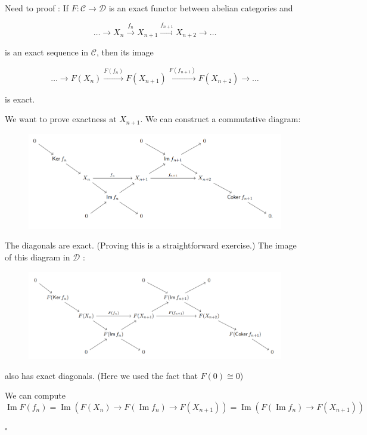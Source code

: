 \documentclass{article}
\newenvironment{Proof}{{\noindent \indent \it Proof:\quad}}{\hfill $\square$\par}
\begin{document}
\begin{Proof}
Need to proof : If $F: \mathscr{C} \rightarrow \mathscr{D}$ is an exact functor between abelian categories and

$$
\ldots \rightarrow X_{n} \stackrel{f_{n}}{\longrightarrow} X_{n+1} \stackrel{f_{n+1}}{\longrightarrow} X_{n+2} \rightarrow \ldots
$$

is an exact sequence in $\mathscr{C}$, then its image

$$
\ldots \rightarrow F\left(X_{n}\right) \stackrel{F\left(f_{n}\right)}{\longrightarrow} F\left(X_{n+1}\right) \stackrel{F\left(f_{n+1}\right)}{\longrightarrow} F\left(X_{n+2}\right) \rightarrow \ldots
$$

is exact.

We want to prove exactness at $X_{n+1}$. We can construct a commutative diagram:
\begin{figure}[htp]
    \centering
    \includegraphics[width=15cm]{1.png}
    \label{fig:1}
\end{figure}

The diagonals are exact. (Proving this is a straightforward exercise.) The image of this diagram in $\mathscr{D}$ :
\begin{figure}[htp]
    \centering
    \includegraphics[width=15cm]{2.png}
    \label{fig:2}
\end{figure}

also has exact diagonals. (Here we used the fact that $F(0) \cong 0$)

We can compute
$$
\operatorname{Im} F\left(f_{n}\right)=\operatorname{Im}\left(F\left(X_{n}\right) \rightarrow F\left(\operatorname{Im} f_{n}\right) \rightarrow F\left(X_{n+1}\right)\right)=\operatorname{Im}\left(F\left(\operatorname{Im} f_{n}\right) \rightarrow F\left(X_{n+1}\right)\right)
$$


\end{Proof}
\end{document}
